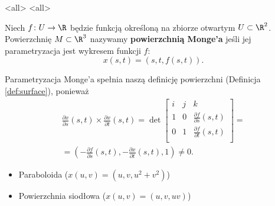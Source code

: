 \mode<all>{}
\mode<all>{}
\begin{frame}[<+->]


\begin{definicja}
Niech $f\colon U\to \R$ będzie funkcją określoną na zbiorze otwartym $U\subset \R^2$. Powierzchnię $M\subset \R^3$ nazywamy \textbf{powierzchnią Monge'a} jeśli jej parametryzacja jest wykresem funkcji $f$:
\[x(s,t)=(s,t,f(s,t)).\]
\begin{center}

\end{center}
\end{definicja}

\end{frame}
\begin{frame}[<+->]

\begin{uwaga}
Parametryzacja Monge'a spełnia naszą definicję powierzchni (Definicja \ref{def:surface}), ponieważ
\begin{multline*}
\frac{\partial x}{\partial s}(s,t)\times \frac{\partial x}{\partial t}(s,t)=\det 
\left[
\begin{array}{ccc}
i&j&k\\
1&0&\frac{\partial f}{\partial s}(s,t)\\
0&1&\frac{\partial f}{\partial t}(s,t)\\
\end{array}
\right]
=\\=\left(-\frac{\partial f}{\partial s}(s,t),-\frac{\partial x}{\partial t}(s,t),1\right)\neq 0.\end{multline*}

\end{uwaga}
\end{frame}
\begin{frame}[<+->]

\begin{przyklad}
\begin{itemize}
\item Paraboloida ($x(u,v)=(u,v,u^2+v^2)$)
\item Powierzchnia siodłowa ($x(u,v)=(u,v,uv)$)
\begin{center}

\end{center}

\end{itemize}

\end{przyklad}

\end{frame}
